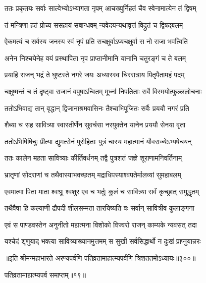 \begin{center}
\twolineshloka
{ततः प्रकृतयः सर्वाः साल्वेभ्योऽभ्यागता नृपम्}
{आचख्युर्निहतं चैव स्वेनामात्येन तं द्विषम्}

\twolineshloka
{तं मन्त्रिणा हतं प्रोच्य ससहायं सबान्धवम्}
{न्यवेदयन्यथावृत्तं विद्रुतं च द्विषद्बलम्}

\twolineshloka
{ऐकमत्यं च सर्वस्य जनस्य स्वं नृपं प्रति}
{सचक्षुर्वाऽप्यचक्षुर्वा स नो राजा भवत्विति}

\twolineshloka
{अनेन निश्चयेनेह वयं प्रस्थापिता नृप}
{प्राप्तानीमानि यानानि चतुरङ्गं च ते बलम्}

\twolineshloka
{प्रयाहि राजन् भद्रं ते घुष्टस्ते नगरे जयः}
{अध्यास्स्व चिररात्राय पितृपैतामहं पदम्}


\twolineshloka
{चक्षुष्मन्तं च तं दृष्ट्वा राजानं वपुषाऽन्वितम्}
{मूर्ध्ना निपतिताः सर्वे विस्मयोत्फुल्ललोचनाः}

\twolineshloka
{ततोऽभिवाद्य तान् वृद्धान् द्विजानाश्रमवासिनः}
{तैश्चाभिपूजितः सर्वैः प्रययौ नगरं प्रति}

\twolineshloka
{शैब्या च सह सावित्र्या स्वास्तीर्णेन सुवर्चसा}
{नरयुक्तेन यानेन प्रययौ सेनया वृता}

\twolineshloka
{ततोऽभिषिषिचुः प्रीत्या द्युमत्सेनं पुरोहिताः}
{पुत्रं चास्य महात्मानं यौवराज्येऽभ्यषेचयन्}

\twolineshloka
{ततः कालेन महता सावित्र्याः कीर्तिवर्धनम्}
{तद्वै पुत्रशतं जज्ञे शूराणामनिवर्तिनाम्}

\twolineshloka
{भ्रातृणां सोदराणां च तथैवास्याभवच्छतम्}
{मद्राधिपस्याश्वपतेर्मालव्यां सुमहाबलम्}

\twolineshloka
{एवमात्मा पिता माता श्वश्रूः श्वशुर एव च}
{भर्तुः कुलं च सावित्र्या सर्वं कृच्छ्रात् समुद्धृतम्}

\twolineshloka
{तथैवैषा हि कल्याणी द्रौपदी शीलसम्मता}
{तारयिष्यति वः सर्वान् सावित्रीव कुलाङ्गना}


\twolineshloka
{एवं स पाण्डवस्तेन अनुनीतो महात्मना}
{विशोको विज्वरो राजन् काम्यके न्यवसत् तदा}

\twolineshloka
{यश्चेदं शृणुयाद् भक्त्या सावित्र्याख्यानमुत्तमम्}
{स सुखी सर्वसिद्धार्थो न दुःखं प्राप्नुयान्नरः}

॥इति श्रीमन्महाभारते अरण्यपर्वणि पतिव्रतामाहात्म्यपर्वणि त्रिशततमोऽध्यायः॥३००॥

पतिव्रतामाहात्म्यपर्व समाप्तम्॥१९॥ 

\end{center}